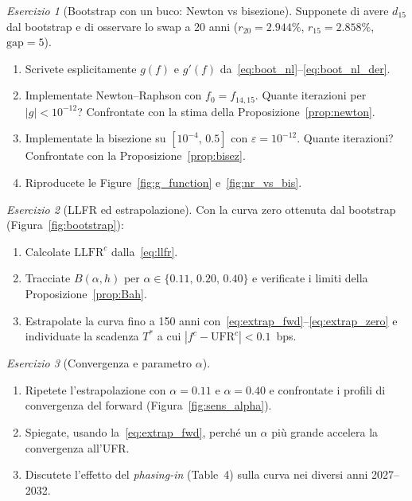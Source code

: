 \documentclass[11pt,a4paper]{article}
\theoremstyle{plain}
\theoremstyle{definition}
\theoremstyle{remark}
\newtheorem{esercizio}{Esercizio}[section]
\newcommand{\UFR}{\mathrm{UFR}}
\newcommand{\LLFR}{\mathrm{LLFR}}
\newcommand{\abs}[1]{\left\lvert #1 \right\rvert}
\begin{document}
\begin{esercizio}[Bootstrap con un buco: Newton vs bisezione]
Supponete di avere $d_{15}$ dal bootstrap e di osservare lo swap a 20 anni
($r_{20}=2.944\%$, $r_{15}=2.858\%$, $\text{gap}=5$).
\begin{enumerate}[label=(\alph*)]
  \item Scrivete esplicitamente $g(f)$ e $g'(f)$ da~\eqref{eq:boot_nl}--\eqref{eq:boot_nl_der}.
  \item Implementate Newton--Raphson con $f_0 = f_{14,15}$. Quante iterazioni per
        $\abs{g}<10^{-12}$? Confrontate con la stima della
        Proposizione~\ref{prop:newton}.
  \item Implementate la bisezione su $[10^{-4},\,0.5]$ con $\varepsilon=10^{-12}$.
        Quante iterazioni? Confrontate con la Proposizione~\ref{prop:bisez}.
  \item Riproducete le Figure~\ref{fig:g_function} e~\ref{fig:nr_vs_bis}.
\end{enumerate}
\end{esercizio}

\begin{esercizio}[LLFR ed estrapolazione]
Con la curva zero ottenuta dal bootstrap (Figura~\ref{fig:bootstrap}):
\begin{enumerate}[label=(\alph*)]
  \item Calcolate $\LLFR^c$ dalla~\eqref{eq:llfr}.
  \item Tracciate $B(\alpha,h)$ per $\alpha\in\{0.11,\,0.20,\,0.40\}$ e verificate i
        limiti della Proposizione~\ref{prop:Bah}.
  \item Estrapolate la curva fino a 150 anni con~\eqref{eq:extrap_fwd}--\eqref{eq:extrap_zero}
        e individuate la scadenza $T^*$ a cui $\abs{f^c-\UFR^c}<0.1$~bps.
\end{enumerate}
\end{esercizio}

\begin{esercizio}[Convergenza e parametro $\alpha$]
\begin{enumerate}[label=(\alph*)]
  \item Ripetete l'estrapolazione con $\alpha = 0.11$ e $\alpha = 0.40$ e confrontate i
        profili di convergenza del forward (Figura~\ref{fig:sens_alpha}).
  \item Spiegate, usando la~\eqref{eq:extrap_fwd}, perch\'e un $\alpha$ pi\`u grande
        accelera la convergenza all'UFR.
  \item Discutete l'effetto del \emph{phasing-in} (Table~4) sulla curva nei diversi
        anni 2027--2032.
\end{enumerate}
\end{esercizio}
\end{document}
